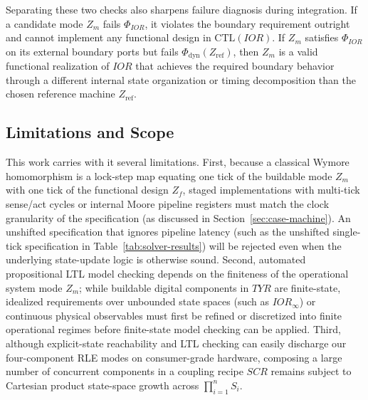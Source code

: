 Separating these two checks also sharpens failure diagnosis during integration. If a candidate mode $Z_m$ fails $\Phi_{IOR}$, it violates the boundary requirement outright and cannot implement any functional design in $\mathrm{CTL}(IOR)$. If $Z_m$ satisfies $\Phi_{IOR}$ on its external boundary ports but fails $\Phi_{\mathrm{dyn}}(Z_{\mathrm{ref}})$, then $Z_m$ is a valid functional realization of $IOR$ that achieves the required boundary behavior through a different internal state organization or timing decomposition than the chosen reference machine $Z_{\mathrm{ref}}$.

\subsection{Limitations and Scope}
\label{sec:limitations}

This work carries with it several limitations. First, because a classical Wymore homomorphism is a lock-step map equating one tick of the buildable mode $Z_m$ with one tick of the functional design $Z_f$, staged implementations with multi-tick sense/act cycles or internal Moore pipeline registers must match the clock granularity of the specification (as discussed in Section~\ref{sec:case-machine}). An unshifted specification that ignores pipeline latency (such as the unshifted single-tick specification in Table~\ref{tab:solver-results}) will be rejected even when the underlying state-update logic is otherwise sound. Second, automated propositional LTL model checking depends on the finiteness of the operational system mode $Z_m$; while buildable digital components in $TYR$ are finite-state, idealized requirements over unbounded state spaces (such as $IOR_\infty$) or continuous physical observables must first be refined or discretized into finite operational regimes before finite-state model checking can be applied. Third, although explicit-state reachability and LTL checking can easily discharge our four-component RLE modes on consumer-grade hardware, composing a large number of concurrent components in a coupling recipe $SCR$ remains subject to Cartesian product state-space growth across $\prod_{i=1}^n S_i$.
